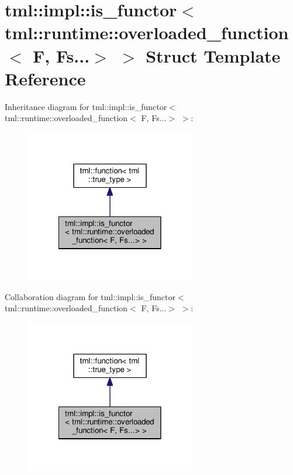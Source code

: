 \hypertarget{structtml_1_1impl_1_1is__functor_3_01tml_1_1runtime_1_1overloaded__function_3_01_f_00_01_fs_8_8_8_4_01_4}{\section{tml\+:\+:impl\+:\+:is\+\_\+functor$<$ tml\+:\+:runtime\+:\+:overloaded\+\_\+function$<$ F, Fs...$>$ $>$ Struct Template Reference}
\label{structtml_1_1impl_1_1is__functor_3_01tml_1_1runtime_1_1overloaded__function_3_01_f_00_01_fs_8_8_8_4_01_4}
}


Inheritance diagram for tml\+:\+:impl\+:\+:is\+\_\+functor$<$ tml\+:\+:runtime\+:\+:overloaded\+\_\+function$<$ F, Fs...$>$ $>$\+:
\nopagebreak
\begin{figure}[H]
\begin{center}
\leavevmode
\includegraphics[width=210pt]{structtml_1_1impl_1_1is__functor_3_01tml_1_1runtime_1_1overloaded__function_3_01_f_00_01_fs_8_8_8_4_01_4__inherit__graph}
\end{center}
\end{figure}


Collaboration diagram for tml\+:\+:impl\+:\+:is\+\_\+functor$<$ tml\+:\+:runtime\+:\+:overloaded\+\_\+function$<$ F, Fs...$>$ $>$\+:
\nopagebreak
\begin{figure}[H]
\begin{center}
\leavevmode
\includegraphics[width=210pt]{structtml_1_1impl_1_1is__functor_3_01tml_1_1runtime_1_1overloaded__function_3_01_f_00_01_fs_8_8_8_4_01_4__coll__graph}
\end{center}
\end{figure}
